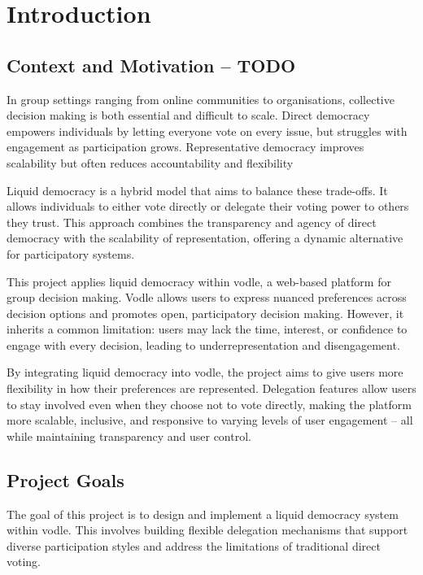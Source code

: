 \chapter{Introduction}\label{ch:introduction}

\section{Context and Motivation -- TODO}

In group settings ranging from online communities to organisations, collective decision making is both essential and difficult to scale. Direct democracy empowers individuals by letting everyone vote on every issue, but struggles with engagement as participation grows. Representative democracy improves scalability but often reduces accountability and flexibility \citep{ford_delegative_2002, blum_liquid_2016}

Liquid democracy is a hybrid model that aims to balance these trade-offs. It allows individuals to either vote directly or delegate their voting power to others they trust. This approach combines the transparency and agency of direct democracy with the scalability of representation, offering a dynamic alternative for participatory systems.

This project applies liquid democracy within vodle, a web-based platform for group decision making. Vodle allows users to express nuanced preferences across decision options and promotes open, participatory decision making. However, it inherits a common limitation: users may lack the time, interest, or confidence to engage with every decision, leading to underrepresentation and disengagement.

By integrating liquid democracy into vodle, the project aims to give users more flexibility in how their preferences are represented. Delegation features allow users to stay involved even when they choose not to vote directly, making the platform more scalable, inclusive, and responsive to varying levels of user engagement -- all while maintaining transparency and user control.

\section{Project Goals}

The goal of this project is to design and implement a liquid democracy system within vodle. This involves building flexible delegation mechanisms that support diverse participation styles and address the limitations of traditional direct voting.

